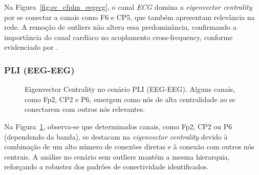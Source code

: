 Na Figura~\ref{fig:ec_cfplm_eegecg}, o canal \emph{ECG} domina a \emph{eigenvector centrality} por se conectar a canais como F6 e CP5, que também apresentam relevância na rede. A remoção de outliers não altera essa predominância, confirmando a importância do canal cardíaco no acoplamento cross-frequency, conforme evidenciado por \cite{bullmore2009complex}.

\subsubsection{PLI (EEG-EEG)}
\begin{figure}[htb]
    \centering
    \quad
    \caption{Eigenvector Centrality no cenário PLI (EEG-EEG). Alguns canais, como Fp2, CP2 e P6, emergem como nós de alta centralidade ao se conectarem com outros nós relevantes.}
    \label{fig:ec_pli_eegeeg}
\end{figure}

Na Figura~\ref{fig:ec_pli_eegeeg}, observa-se que determinados canais, como Fp2, CP2 ou P6 (dependendo da banda), se destacam na \emph{eigenvector centrality} devido à combinação de um alto número de conexões diretas e à conexão com outros nós centrais. A análise no cenário sem outliers mantém a mesma hierarquia, reforçando a robustez dos padrões de conectividade identificados.

